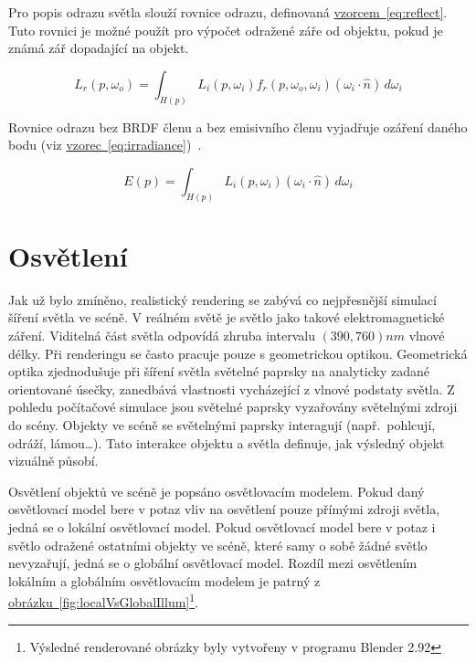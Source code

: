 \documentclass[czech,master]{diploma}
\newcommand{\intervaloo}[2]{\left({{#1},{#2}}\right)}
\newcommand{\uvec}[1]{\hat{#1}}
\newcommand{\point}{p}
\newcommand{\brdf}{f_r\left(\point,\omega_{o},\omega_{i}\right)}
\newcommand{\normVec}{\uvec{n}}
\newcommand{\inVec}{\omega_{i}}
\newcommand{\outVec}{\omega_{o}}
\newcommand{\reflRadiance}{L_r\left(\point,\outVec\right)}
\newcommand{\inRadiance}{L_i\left(\point,\inVec\right)}
\newcommand{\irradiance}{E\left(\point\right)}
\newcommand{\inDotNorm}{\left(\inVec\cdot\normVec\right)}
\begin{document}
Pro popis odrazu světla slouží rovnice odrazu, definovaná \hyperref[eq:render]{vzorcem~\ref{eq:reflect}}. Tuto rovnici je možné použít pro výpočet odražené záře od objektu, pokud je známá zář dopadající na objekt.

\begin{equation} \label{eq:reflect}
  \reflRadiance = \int_{H \left( \point \right)}^{~}\inRadiance \brdf \inDotNorm \,d\inVec
\end{equation}

Rovnice odrazu bez BRDF členu a bez emisivního členu vyjadřuje ozáření daného bodu (viz \hyperref[eq:irradiance]{vzorec~\ref{eq:irradiance}})~\cite{Dutre2003GICompendum}.

\begin{equation} \label{eq:irradiance}
  \irradiance = \int_{H \left( \point \right)}^{~}\inRadiance \inDotNorm \,d\inVec
\end{equation}

\section{Osvětlení}
Jak už bylo zmíněno, realistický rendering se zabývá co nejpřesnější simulací šíření světla ve scéně. V reálném světě je světlo jako takové elektromagnetické záření. Viditelná část světla odpovídá zhruba intervalu \(\intervaloo{390}{760}nm\) vlnové délky. Při renderingu se často pracuje pouze s geometrickou optikou. Geometrická optika zjednodušuje při šíření světla světelné paprsky na analyticky zadané orientované úsečky, zanedbává vlastnosti vycházející z vlnové podstaty světla. Z pohledu počítačové simulace jsou světelné paprsky vyzařovány světelnými zdroji do scény. Objekty ve scéně se světelnými paprsky interagují (např.~pohlcují, odráží, lámou\dots). Tato interakce objektu a světla definuje, jak výsledný objekt vizuálně působí.\par
Osvětlení objektů ve scéně je popsáno osvětlovacím modelem. Pokud daný osvětlovací model bere v potaz vliv na osvětlení pouze přímými zdroji světla, jedná se o lokální osvětlovací model. Pokud osvětlovací model bere v potaz i světlo odražené ostatními objekty ve scéně, které samy o sobě žádné světlo nevyzařují, jedná se o globální osvětlovací model. Rozdíl mezi osvětlením lokálním a globálním osvětlovacím modelem je patrný z \hyperref[fig:localVsGlobalIllum]{obrázku~\ref{fig:localVsGlobalIllum}}\footnote{Výsledné renderované obrázky byly vytvořeny v programu Blender 2.92}.
\end{document}
